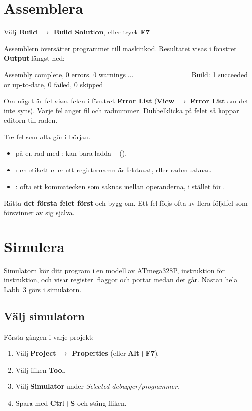 \section{Assemblera}
\label{studio:3}
Välj \textbf{Build $\rightarrow$ Build Solution}, eller tryck \textbf{F7}.

Assemblern översätter programmet till maskinkod. Resultatet visas i fönstret \textbf{Output} längst
ned:

\begin{console}
Assembly complete, 0 errors. 0 warnings
...
========== Build: 1 succeeded or up-to-date, 0 failed, 0 skipped ==========
\end{console}

Om något är fel visas felen i fönstret \textbf{Error List} (\textbf{View $\rightarrow$ Error List}
om det inte syns). Varje fel anger fil och radnummer. Dubbelklicka på felet så hoppar editorn till
raden.

Tre fel som alla gör i början:
\begin{itemize}
  \item \textbf{} på en rad med :  kan bara ladda
    -- ().
  \item \textbf{}: en etikett eller ett registernamn är felstavat, eller
    raden  saknas.
  \item \textbf{}: ofta ett kommatecken som saknas mellan operanderna,
     i stället för .
\end{itemize}

Rätta \textbf{det första felet först} och bygg om. Ett fel följs ofta av flera följdfel som
försvinner av sig själva.

\section{Simulera}
\label{studio:4}
Simulatorn kör ditt program i en modell av ATmega328P, instruktion för instruktion, och visar
register, flaggor och portar medan det går. Nästan hela Labb~3 görs i simulatorn.

\subsection{Välj simulatorn}
\label{studio:4-1}
Första gången i varje projekt:
\begin{enumerate}
  \item Välj \textbf{Project $\rightarrow$ Properties} (eller \textbf{Alt+F7}).
  \item Välj fliken \textbf{Tool}.
  \item Välj \textbf{Simulator} under \emph{Selected debugger/programmer}.
  \item Spara med \textbf{Ctrl+S} och stäng fliken.
\end{enumerate}

